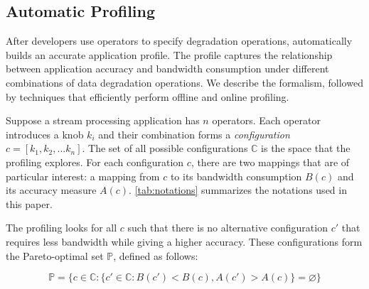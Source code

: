 \subsection{Automatic Profiling}
\label{sec:automatic-profiling}

After developers use \maybe{} operators to specify degradation operations,
\sysname{} automatically builds an accurate application profile. The profile
captures the relationship between application accuracy and bandwidth consumption
under different combinations of data degradation operations. We describe the
formalism, followed by techniques that efficiently perform offline and online
profiling.

 Suppose a stream processing application has $n$
\maybe{} operators. Each operator introduces a knob $k_i$ and their combination
forms a \textit{configuration} $c = [k_{1}, k_{2}, ... k_{n}]$. The set of all
possible configurations $\mathbb{C}$ is the space that the profiling
explores. For each configuration $c$, there are two mappings that are of
particular interest: a mapping from $c$ to its bandwidth consumption $B(c)$ and
its accuracy measure $A(c)$. \autoref{tab:notations} summarizes the notations used in
this paper.

The profiling looks for all $c$ such that there is no alternative
configuration $c'$ that requires less bandwidth while giving a higher
accuracy. These configurations form the Pareto-optimal set $\mathbb{P}$, defined
as follows:

{\small \vspace{-1em}
  \begin{equation}
  \mathbb{P} = \{ c \in \mathbb{C} : \{ c' \in \mathbb{C}: B(c') < B(c),
  A(c') > A(c) \} = \varnothing\}
  \label{eq:pareto}
\end{equation}
}%

